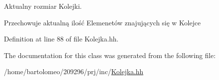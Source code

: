 Aktualny rozmiar Kolejki. 

Przechowuje aktualną ilość Elemenetów znajujących się w Kolejce 

Definition at line 88 of file Kolejka.\-hh.



The documentation for this class was generated from the following file\-:\begin{DoxyCompactItemize}
\item 
/home/bartolomeo/209296/prj/inc/\hyperlink{_kolejka_8hh}{Kolejka.\-hh}\end{DoxyCompactItemize}
